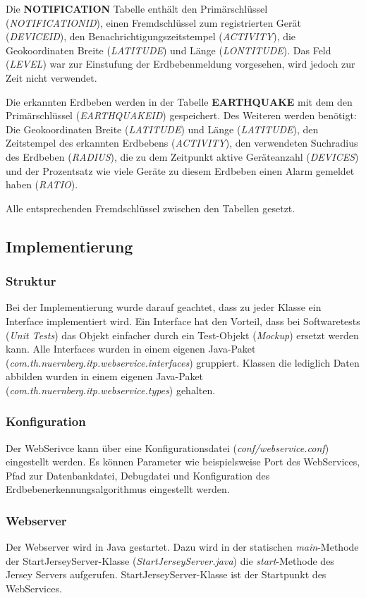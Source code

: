 Die \textbf{NOTIFICATION} Tabelle enthält den Primärschlüssel (\textit{NOTIFICATIONID}), einen Fremdschlüssel zum registrierten Gerät (\textit{DEVICEID}), den Benachrichtigungszeitstempel (\textit{ACTIVITY}), die Geokoordinaten Breite (\textit{LATITUDE}) und Länge (\textit{LONTITUDE}). Das Feld (\textit{LEVEL}) war zur Einstufung der Erdbebenmeldung vorgesehen, wird jedoch zur Zeit nicht verwendet.

Die erkannten Erdbeben werden in der Tabelle \textbf{EARTHQUAKE} mit dem den Primärschlüssel (\textit{EARTHQUAKEID}) gespeichert. Des Weiteren werden benötigt: Die Geokoordinaten Breite (\textit{LATITUDE}) und Länge (\textit{LATITUDE}), den Zeitstempel des erkannten Erdbebens (\textit{ACTIVITY}), den verwendeten Suchradius des Erdbeben (\textit{RADIUS}), die zu dem Zeitpunkt aktive Geräteanzahl (\textit{DEVICES}) und der Prozentsatz wie viele Geräte zu diesem Erdbeben einen Alarm gemeldet haben (\textit{RATIO}).

Alle entsprechenden Fremdschlüssel zwischen den Tabellen gesetzt.

\subsection{Implementierung}
\subsubsection{Struktur}
Bei der Implementierung wurde darauf geachtet, dass zu jeder Klasse ein Interface implementiert wird. Ein Interface hat den Vorteil, dass bei Softwaretests (\textit{Unit Tests}) das Objekt einfacher durch ein Test-Objekt (\textit{Mockup}) ersetzt werden kann. Alle Interfaces wurden in einem eigenen Java-Paket (\textit{com.th.nuernberg.itp.webservice.interfaces}) gruppiert. Klassen die lediglich Daten abbilden wurden in einem eigenen Java-Paket (\textit{com.th.nuernberg.itp.webservice.types}) gehalten.

\subsubsection{Konfiguration}
Der WebSerivce kann über eine Konfigurationsdatei (\textit{conf/webservice.conf}) eingestellt werden. Es können Parameter wie beispielsweise Port des WebServices, Pfad zur Datenbankdatei, Debugdatei und Konfiguration des Erdbebenerkennungsalgorithmus eingestellt werden.


\subsubsection{Webserver}
Der Webserver wird in Java gestartet. Dazu wird in der statischen \textit{main}-Methode der StartJerseyServer-Klasse (\textit{StartJerseyServer.java}) die \textit{start}-Methode des Jersey Servers aufgerufen. StartJerseyServer-Klasse ist der Startpunkt des WebServices. 

